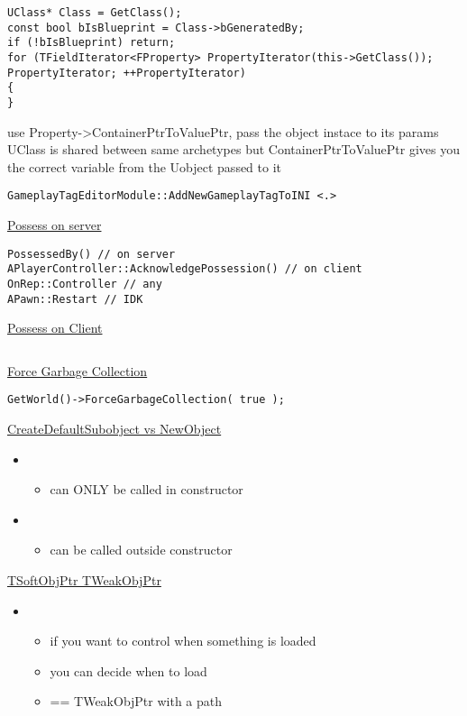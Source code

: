 \begin{lstlisting}
UClass* Class = GetClass();
const bool bIsBlueprint = Class->bGeneratedBy;
if (!bIsBlueprint) return;
for (TFieldIterator<FProperty> PropertyIterator(this->GetClass()); PropertyIterator; ++PropertyIterator)
{
}
\end{lstlisting}
use Property->ContainerPtrToValuePtr, pass the object instace to its params
UClass is shared between same archetypes
but ContainerPtrToValuePtr gives you the correct variable from the Uobject passed to it


\begin{lstlisting}
GameplayTagEditorModule::AddNewGameplayTagToINI <.>
\end{lstlisting}

\uline{Possess on server}
\begin{lstlisting}
PossessedBy() // on server
APlayerController::AcknowledgePossession() // on client
OnRep::Controller // any
APawn::Restart // IDK
\end{lstlisting}


\uline{Possess on Client}
\begin{lstlisting}
\end{lstlisting}


\uline{Force Garbage Collection}
\begin{lstlisting}
GetWorld()->ForceGarbageCollection( true );
\end{lstlisting}

\uline{CreateDefaultSubobject vs NewObject}
    \begin{itemize}
        \item {}
        \begin{itemize}
            \item can ONLY be called in constructor
        \end{itemize}
    \end{itemize}
    \begin{itemize}
        \item {}
        \begin{itemize}
            \item can be called outside constructor
        \end{itemize}
    \end{itemize}

\uline{TSoftObjPtr TWeakObjPtr}
\begin{itemize}
    \item {}
    \begin{itemize}
        \item if you want to control when something is loaded
        \item you can decide when to load
        \item == TWeakObjPtr with a path
    \end{itemize}
\end{itemize}


